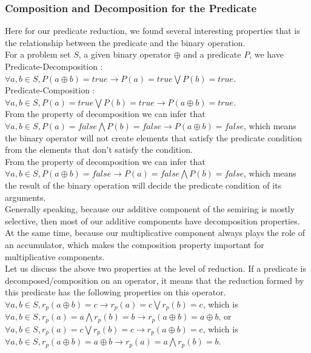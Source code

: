 \documentclass[a4paper,10pt]{article}
\begin{document}
\subsubsection{Composition and Decomposition for the Predicate}
Here for our predicate reduction, we found several interesting properties that is the relationship between the predicate and the binary operation.\\
For a problem set $S$, a given binary operator $\oplus$ and a predicate $P$, we have\\
Predicate-Decomposition : $\forall a,b \in S, P(a \oplus b)= true \rightarrow P(a) = true \bigvee P (b) = true$.\\
Predicate-Composition : $\forall a,b \in S, P(a) = true \bigvee P (b) = true \rightarrow P(a \oplus b)= true$.\\ 
From the property of decomposition we can infer that $\forall a,b \in S, P(a) = false \bigwedge P (b) = false \rightarrow P(a \oplus b)= false$, which means the binary operator will not create elements that satisfy the predicate condition from the elements that don't satisfy the condition.\\
From the property of decomposition we can infer that $\forall a,b \in S, P(a \oplus b)= false \rightarrow P(a) = false \bigwedge P (b) = false$, which means the result of the binary operation will decide the predicate condition of its arguments.\\
Generally speaking, because our additive component of the semiring is mostly selective, then most of our additive components have decomposition properties. At the same time, because our multiplicative component always plays the role of an accumulator, which makes the composition property important for multiplicative components.\\
Let us discuss the above two properties at the level of reduction. If a predicate is decomposed/composition on an operator, it means that the reduction formed by this predicate has the following properties on this operator.\\
$\forall a,b \in S, r_p(a\oplus b) = c \rightarrow r_p(a) = c \bigvee r_p (b) = c$, which is 
$\forall a,b \in S, r_p(a) = a \bigwedge r_p (b) = b \rightarrow r_p(a \oplus b)= a \oplus b$, or\\
$\forall a,b \in S, r_p(a) = c \bigvee r_p (b) = c \rightarrow r_p(a \oplus b)= c$, which is 
$\forall a,b \in S, r_p(a\oplus b) = a \oplus b \rightarrow r_p(a) = a \bigwedge r_p (b) = b$.\\
\end{document}
